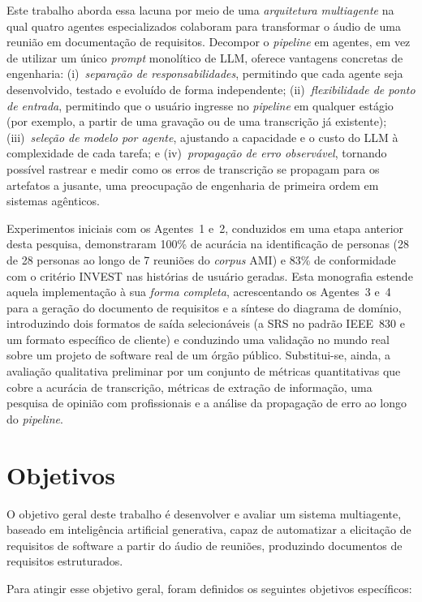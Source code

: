 Este trabalho aborda essa lacuna por meio de uma \emph{arquitetura multiagente} na qual quatro agentes especializados colaboram para transformar o áudio de uma reunião em documentação de requisitos. Decompor o \textit{pipeline} em agentes, em vez de utilizar um único \textit{prompt} monolítico de LLM, oferece vantagens concretas de engenharia: (i)~\textit{separação de responsabilidades}, permitindo que cada agente seja desenvolvido, testado e evoluído de forma independente; (ii)~\textit{flexibilidade de ponto de entrada}, permitindo que o usuário ingresse no \textit{pipeline} em qualquer estágio (por exemplo, a partir de uma gravação ou de uma transcrição já existente); (iii)~\textit{seleção de modelo por agente}, ajustando a capacidade e o custo do LLM à complexidade de cada tarefa; e (iv)~\textit{propagação de erro observável}, tornando possível rastrear e medir como os erros de transcrição se propagam para os artefatos a jusante, uma preocupação de engenharia de primeira ordem em sistemas agênticos.

Experimentos iniciais com os Agentes~1 e~2, conduzidos em uma etapa anterior desta pesquisa, demonstraram 100\% de acurácia na identificação de personas (28 de 28 personas ao longo de 7 reuniões do \textit{corpus} AMI) e 83\% de conformidade com o critério INVEST nas histórias de usuário geradas. Esta monografia estende aquela implementação à sua \emph{forma completa}, acrescentando os Agentes~3 e~4 para a geração do documento de requisitos e a síntese do diagrama de domínio, introduzindo dois formatos de saída selecionáveis (a SRS no padrão IEEE~830 e um formato específico de cliente) e conduzindo uma validação no mundo real sobre um projeto de software real de um órgão público. Substitui-se, ainda, a avaliação qualitativa preliminar por um conjunto de métricas quantitativas que cobre a acurácia de transcrição, métricas de extração de informação, uma pesquisa de opinião com profissionais e a análise da propagação de erro ao longo do \textit{pipeline}.

\section{Objetivos}

O objetivo geral deste trabalho é desenvolver e avaliar um sistema multiagente, baseado em inteligência artificial generativa, capaz de automatizar a elicitação de requisitos de software a partir do áudio de reuniões, produzindo documentos de requisitos estruturados.

Para atingir esse objetivo geral, foram definidos os seguintes objetivos específicos:

